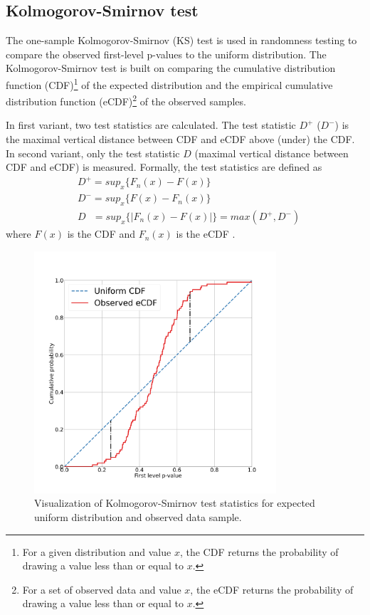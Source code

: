 \documentclass[
  digital,     %
  oneside,     %
  nosansbold,  %
  nocolorbold, %
  nolof,         %
  nolot,         %
]{fithesis4}
\begin{document}

\subsection{Kolmogorov-Smirnov test}
The one-sample Kolmogorov-Smirnov (KS) test is used in randomness testing to compare the observed first-level p-values to the uniform distribution. The Kolmogorov-Smirnov test is built on comparing the cumulative distribution function (CDF)\footnote{For a given distribution and value $x$, the CDF returns the probability of drawing a value less than or equal to $x$.} of the expected distribution and the empirical cumulative distribution function (eCDF)\footnote{For a set of observed data and value $x$, the eCDF returns the probability of drawing a value less than or equal to $x$.} of the observed samples. %

In first variant, two test statistics are calculated. The test statistic $D^+$ ($D^-$) is the maximal vertical distance between CDF and eCDF above (under) the CDF. In second variant, only the test statistic $D$ (maximal vertical distance between CDF and eCDF) is measured. Formally, the test statistics are defined as
\[\begin{split}
    &D^+ = sup_x\{F_n(x) - F(x)\}\\
    &D^- = sup_x\{F(x) - F_n(x)\}\\
    &D \:\:\:= sup_x\{|F_n(x) - F(x)|\} = max(D^+, D^-)
\end{split}
\] where $F(x)$ is the CDF and $F_n(x)$ is the  eCDF \cite[p. 100]{GOF-techniques}.


\begin{figure}
  \begin{center}
    \includegraphics[width=9cm]{figures/ks_d.png}
  \end{center}
  \caption{Visualization of Kolmogorov-Smirnov test statistics for expected uniform distribution and observed data sample.}
  \label{fig:ks_d}
\end{figure}
\end{document}
